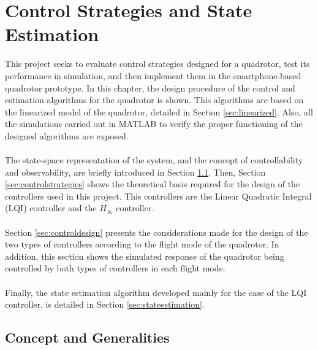 \chapter{Control Strategies and State Estimation} \label{ch:controlandestimation}
This project seeks to evaluate control strategies designed for a quadrotor, test its performance in simulation, and then implement them in the smartphone-based quadrotor prototype. In this chapter, the design procedure of the control and estimation algorithms for the quadrotor is shown. This algorithms are based on the linearized model of the quadrotor, detailed in Section \ref{sec:linearized}. Also, all the simulations carried out in MATLAB to verify the proper functioning of the designed algorithms are exposed.
\\\\
The state-space representation of the system, and the concept of controllability and observability, are briefly introduced in Section \ref{sec:generalities}. Then, Section \ref{sec:controlstrategies} shows the theoretical basis required for the design of the controllers used in this project. This controllers are the Linear Quadratic Integral (LQI) controller and the $H_\infty$ controller.
\\\\
Section \ref{sec:controldesign} presents the considerations made for the design of the two types of controllers according to the flight mode of the quadrotor. In addition, this section shows the simulated response of the quadrotor being controlled by both types of controllers in each flight mode.
\\\\
Finally, the state estimation algorithm developed mainly for the case of the LQI controller, is detailed in Section \ref{sec:stateestimation}.

\section{Concept and Generalities}
\label{sec:generalities}

